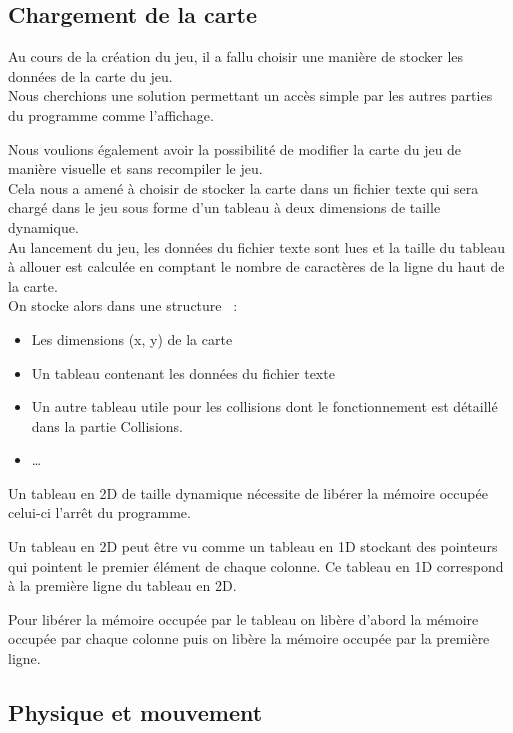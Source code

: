 \documentclass[12pt]{article}
\begin{document}
		\subsection{Chargement de la carte}
		
			Au cours de la création du jeu, il a fallu choisir une manière de stocker les données de la carte du jeu.\\


			Nous cherchions une solution permettant un accès simple par les autres parties du programme comme l’affichage.
		
			Nous voulions également avoir la possibilité de modifier la carte du jeu de manière visuelle et sans recompiler le jeu.\\


			Cela nous a amené à choisir de stocker la carte dans un fichier texte qui sera chargé dans le jeu sous forme 
			d’un tableau à deux dimensions de taille dynamique.\\
		
			Au lancement du jeu, les données du fichier texte sont lues et la taille du tableau à allouer est calculée en 
			comptant le nombre de caractères de la ligne du haut de la carte.\\
		
			On stocke alors dans une structure  :
			\begin{itemize}
				\item Les dimensions (x, y) de la carte
				\item Un tableau contenant les données du fichier texte
				\item Un autre tableau utile pour les collisions dont le fonctionnement est détaillé dans la partie Collisions.
				\item \dots\\
			\end{itemize}
		
			Un tableau en 2D de taille dynamique nécessite de libérer la mémoire occupée celui-ci l’arrêt du programme.
		
			Un tableau en 2D peut être vu comme un tableau en 1D stockant des pointeurs qui pointent le premier élément 
			de chaque colonne. Ce tableau en 1D correspond à la première ligne du tableau en 2D.
		
			Pour libérer la mémoire occupée par le tableau on libère d’abord la mémoire occupée par chaque colonne puis 
			on libère la mémoire occupée par la première ligne.
		
	
		\subsection{Physique et mouvement}
		
\end{document}
